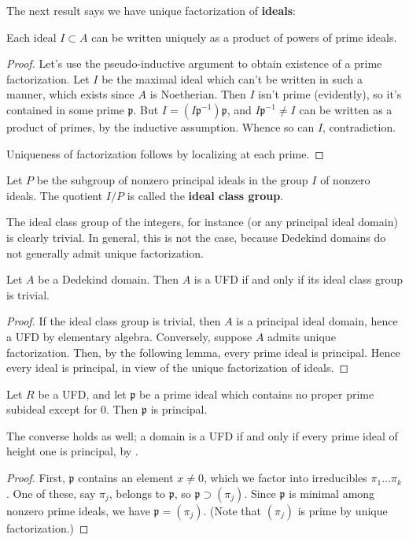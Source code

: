 The next result says we have unique factorization of \textbf{ideals}:
\begin{theorem}[Factorization] Each ideal $I \subset A$ can be written uniquely as a product of powers of prime ideals.
\end{theorem}
\begin{proof}
Let's use the pseudo-inductive argument to obtain existence of a prime factorization.  Let $I$ be the maximal ideal which can't be written in such a manner, which exists since $A$ is Noetherian.  Then $I$ isn't prime (evidently), so it's contained in some prime $\mathfrak{p}$.  But $I = (I\mathfrak{p}^{-1})\mathfrak{p}$, and $I\mathfrak{p}^{-1} \neq I$ can be written as a product of primes, by the inductive assumption. Whence so can $I$, contradiction.

Uniqueness of factorization follows by localizing at each prime.
\end{proof}

\begin{definition} Let $P$ be the subgroup of nonzero principal ideals in the group $I$ of nonzero ideals.  The quotient $I/P$ is called the \textbf{ideal class group}.
\end{definition}

The ideal class group of the integers, for instance (or any principal ideal domain) is clearly trivial.  In general, this is not the case, because Dedekind domains do not generally admit unique factorization.
\begin{proposition} Let $A$ be a Dedekind domain. Then $A$ is a UFD if and only if its ideal class group is trivial.
\end{proposition}
\begin{proof} If the ideal class group is trivial, then $A$ is a principal ideal domain, hence a UFD by elementary algebra.  Conversely, suppose $A$ admits unique factorization.  
Then, by the following lemma, every prime ideal is principal.  Hence every ideal is principal, in view of the unique factorization of ideals.
\end{proof}
\begin{lemma} Let $R$ be a UFD, and let $\mathfrak{p}$ be a prime ideal which contains no proper prime subideal except for $0$.  Then $\mathfrak{p}$ is principal.
\end{lemma}
The converse holds as well; a domain is a UFD if and only if every prime ideal
of height one is principal, by .
\begin{proof}
First, $\mathfrak{p}$ contains an element $x \neq 0$, which we factor into irreducibles $\pi_1 \dots \pi_k$.  One of these, say $\pi_j$, belongs to $\mathfrak{p}$, so $\mathfrak{p} \supset (\pi_j)$. Since $\mathfrak{p}$ is minimal among nonzero prime ideals, we have $\mathfrak{p} = (\pi_j)$.  (Note that $(\pi_j)$ is prime by unique factorization.)
\end{proof}

